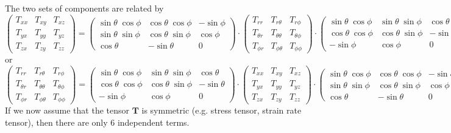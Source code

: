 The two sets of components are related by
\[
\left(
\begin{array}{ccc}
T_{xx} & T_{xy} & T_{xz} \\
T_{yx} & T_{yy} & T_{yz} \\
T_{zx} & T_{zy} & T_{zz} 
\end{array}
\right)
=
\left(
\begin{array}{ccc}
\sin\theta \; \cos\phi & \cos\theta \; \cos\phi & -\sin\phi \\
\sin\theta \; \sin\phi & \cos\theta \; \sin\phi &  \cos\phi \\
\cos\theta & -\sin\theta & 0 
\end{array}
\right)
\cdot
\left(
\begin{array}{ccc}
T_{rr}       & T_{r\theta}      & T_{r\phi} \\
T_{\theta r} & T_{\theta\theta} & T_{\theta\phi} \\
T_{\phi r}   & T_{\phi \theta}  & T_{\phi\phi}
\end{array}
\right)
\cdot
\left(
\begin{array}{ccc}
\sin\theta\;\cos\phi & \sin\theta\;\sin\phi & \cos\theta \\
\cos\theta\;\cos\phi & \cos\theta\;\sin\phi & -\sin\theta \\
-\sin\phi & \cos\phi & 0 
\end{array}
\right)
\]
or
\[
\left(
\begin{array}{ccc}
T_{rr}       & T_{r\theta}      & T_{r\phi} \\
T_{\theta r} & T_{\theta\theta} & T_{\theta\phi} \\
T_{\phi r}   & T_{\phi \theta}  & T_{\phi\phi}
\end{array}
\right)
=
\left(
\begin{array}{ccc}
\sin\theta \; \cos\phi & \sin\theta \; \sin\phi & \cos\theta \\
\cos\theta \; \cos\phi & \cos\theta \; \sin\phi & -\sin\theta \\
-\sin\phi & \cos\phi & 0 
\end{array}
\right)
\cdot
\left(
\begin{array}{ccc}
T_{xx} & T_{xy} & T_{xz} \\
T_{yx} & T_{yy} & T_{yz} \\
T_{zx} & T_{zy} & T_{zz} 
\end{array}
\right)
\cdot
\left(
\begin{array}{ccc}
\sin\theta\;\cos\phi & \cos\theta\;\cos\phi & -\sin\phi \\
\sin\theta\;\sin\phi & \cos\theta\;\sin\phi & \cos\phi \\
\cos\theta & -\sin\theta & 0
\end{array}
\right)
\]
If we now assume that the tensor ${\bm T}$ is symmetric (e.g. stress tensor, strain rate tensor),
then there are only 6 independent terms.

